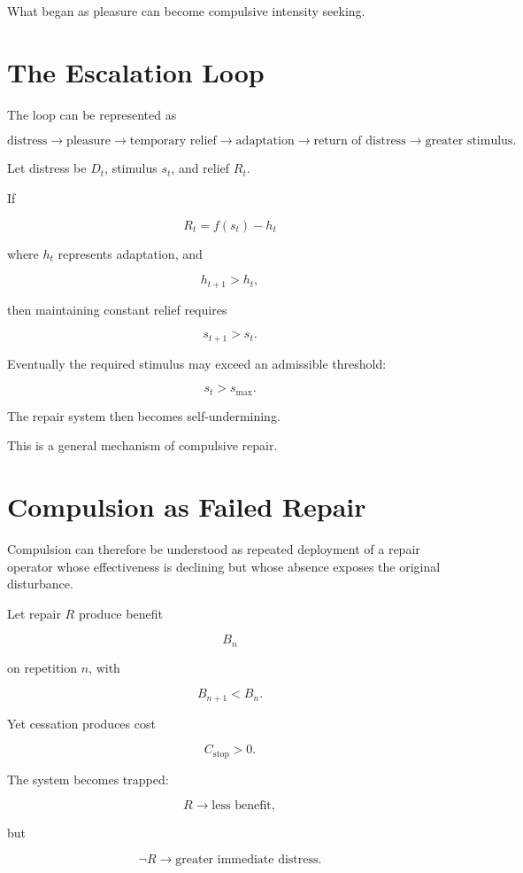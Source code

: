 \documentclass[11pt,oneside]{book}
\theoremstyle{definition}
\theoremstyle{remark}
\begin{document}
What began as pleasure can become compulsive intensity seeking.

\section{The Escalation Loop}

The loop can be represented as

\[
\text{distress}
\rightarrow
\text{pleasure}
\rightarrow
\text{temporary relief}
\rightarrow
\text{adaptation}
\rightarrow
\text{return of distress}
\rightarrow
\text{greater stimulus}.
\]

Let distress be \(D_t\), stimulus \(s_t\), and relief \(R_t\).

If

\[
R_t=f(s_t)-h_t
\]

where \(h_t\) represents adaptation, and

\[
h_{t+1}>h_t,
\]

then maintaining constant relief requires

\[
s_{t+1}>s_t.
\]

Eventually the required stimulus may exceed an admissible threshold:

\[
s_t>s_{\max}.
\]

The repair system then becomes self-undermining.

This is a general mechanism of compulsive repair.

\section{Compulsion as Failed Repair}

Compulsion can therefore be understood as repeated deployment of a repair operator whose effectiveness is declining but whose absence exposes the original disturbance.

Let repair \(R\) produce benefit

\[
B_n
\]

on repetition \(n\), with

\[
B_{n+1}<B_n.
\]

Yet cessation produces cost

\[
C_{\mathrm{stop}}>0.
\]

The system becomes trapped:

\[
R
\rightarrow
\text{less benefit},
\]

but

\[
\neg R
\rightarrow
\text{greater immediate distress}.
\]
\end{document}
